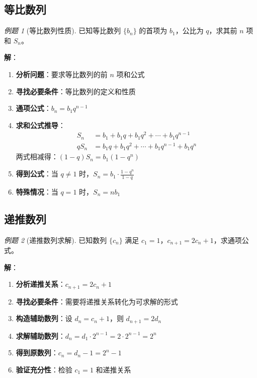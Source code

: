 \documentclass[a4paper,11pt]{ctexart}
\newcommand{\keypoint}[1]{\textcolor{secondary}{\textbf{#1}}}
\theoremstyle{definition}
\theoremstyle{remark}
\newtheorem{example}{例题}[section]
\begin{document}
\subsection{等比数列}

\begin{example}[等比数列性质]
已知等比数列 $\{b_n\}$ 的首项为 $b_1$，公比为 $q$，求其前 $n$ 项和 $S_n$。

\textbf{解}：
\begin{enumerate}
    \item \keypoint{分析问题}：要求等比数列的前 $n$ 项和公式
    \item \keypoint{寻找必要条件}：等比数列的定义和性质
    \item \keypoint{通项公式}：$b_n = b_1 q^{n-1}$
    \item \keypoint{求和公式推导}：
    \begin{align}
    S_n &= b_1 + b_1q + b_1q^2 + \cdots + b_1q^{n-1} \\
    qS_n &= b_1q + b_1q^2 + \cdots + b_1q^{n-1} + b_1q^n
    \end{align}
    两式相减得：$(1-q)S_n = b_1(1-q^n)$
    \item \keypoint{得到公式}：当 $q \neq 1$ 时，$S_n = b_1 \cdot \frac{1-q^n}{1-q}$
    \item \keypoint{特殊情况}：当 $q = 1$ 时，$S_n = nb_1$
\end{enumerate}
\end{example}

\subsection{递推数列}

\begin{example}[递推数列求解]
已知数列 $\{c_n\}$ 满足 $c_1 = 1$，$c_{n+1} = 2c_n + 1$，求通项公式。

\textbf{解}：
\begin{enumerate}
    \item \keypoint{分析递推关系}：$c_{n+1} = 2c_n + 1$
    \item \keypoint{寻找必要条件}：需要将递推关系转化为可求解的形式
    \item \keypoint{构造辅助数列}：设 $d_n = c_n + 1$，则 $d_{n+1} = 2d_n$
    \item \keypoint{求解辅助数列}：$d_n = d_1 \cdot 2^{n-1} = 2 \cdot 2^{n-1} = 2^n$
    \item \keypoint{得到原数列}：$c_n = d_n - 1 = 2^n - 1$
    \item \keypoint{验证充分性}：检验 $c_1 = 1$ 和递推关系
\end{enumerate}
\end{example}
\end{document}
